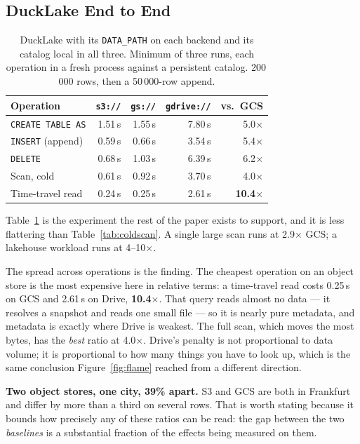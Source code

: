 \documentclass[sigconf, nonacm]{acmart}
\begin{document}
\subsection{DuckLake End to End}
\label{sec:ducklake}

\begin{table}[t]
\caption{DuckLake with its \texttt{DATA\_PATH} on each backend and its catalog
local in all three. Minimum of three runs, each operation in a fresh process
against a persistent catalog. 200\,000 rows, then a 50\,000-row append.}
\label{tab:ducklake}
\small
\begin{tabular}{lrrrr}
\toprule
Operation & \texttt{s3://} & \texttt{gs://} & \texttt{gdrive://} & vs.\ GCS \\
\midrule
\texttt{CREATE TABLE AS} & 1.51\,s & 1.55\,s & 7.80\,s & 5.0$\times$ \\
\texttt{INSERT} (append) & 0.59\,s & 0.66\,s & 3.54\,s & 5.4$\times$ \\
\texttt{DELETE}          & 0.68\,s & 1.03\,s & 6.39\,s & 6.2$\times$ \\
Scan, cold               & 0.61\,s & 0.92\,s & 3.70\,s & 4.0$\times$ \\
Time-travel read         & 0.24\,s & 0.25\,s & 2.61\,s & \textbf{10.4$\times$} \\
\bottomrule
\end{tabular}
\end{table}

Table~\ref{tab:ducklake} is the experiment the rest of the paper exists to
support, and it is less flattering than Table~\ref{tab:coldscan}. A single
large scan runs at 2.9$\times$ GCS; a lakehouse workload runs at 4--10$\times$.

The spread across operations is the finding. The cheapest operation on an
object store is the most expensive here in relative terms: a time-travel read
costs 0.25\,s on GCS and 2.61\,s on Drive, \textbf{10.4$\times$}. That query
reads almost no data --- it resolves a snapshot and reads one small file --- so
it is nearly pure metadata, and metadata is exactly where Drive is weakest.
The full scan, which moves the most bytes, has the \emph{best} ratio at
4.0$\times$. Drive's penalty is not proportional to data volume; it is
proportional to how many things you have to look up, which is the same
conclusion Figure~\ref{fig:flame} reached from a different direction.

\textbf{Two object stores, one city, 39\% apart.} S3 and GCS are both in
Frankfurt and differ by more than a third on several rows. That is worth
stating because it bounds how precisely any of these ratios can be read: the
gap between the two \emph{baselines} is a substantial fraction of the effects
being measured on them.
\end{document}
